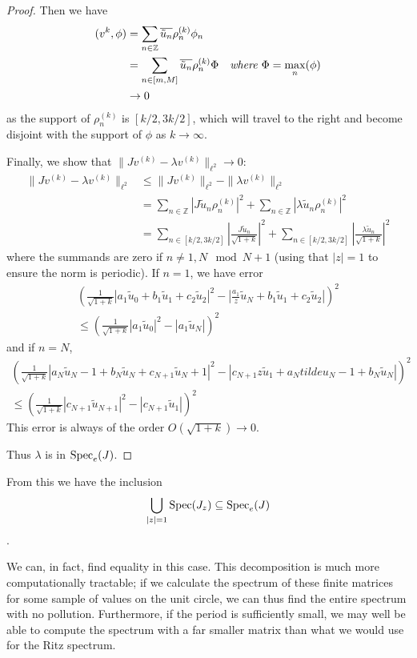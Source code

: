 \documentclass[../main.tex]{subfiles}
\begin{document}
\begin{proof}
Then we have
\begin{align*}
  (v^{k}, \phi) & =  \sum_{n \in \mathbb{Z}}
  \overline{\tilde{u}_n} \rho_n^{(k)} \phi_n & \\
  & = \sum_{n \in [m, M]} \overline{\tilde{u}_n} \rho_n^{(k)} \Phi 
    & \text{\emph{where $\Phi = \max_{n}(\phi)$}} \\
  & \rightarrow 0 & 
\end{align*}
  as the support of $\rho_n^{(k)}$ is $[k/2, 3k/2]$, which will travel to the 
  right and become disjoint with the support of $\phi$ as $k \rightarrow \infty$.

Finally, we show that $\|Jv^{(k)} - \lambda v^{(k)}\|_{\ell^2} \rightarrow 0$:
\begin{align*}
    \|Jv^{(k)} - \lambda v^{(k)}\|_{\ell^2} & \leq \|Jv^{(k)}\|_{\ell^2}  - \|\lambda v^{(k)}\|_{\ell^2}  \\
    & = \sum_{n \in \mathbb{Z}}|J\tilde{u}_n \rho_n^{(k)}|^2 + \sum_{n \in \mathbb{Z}}|\lambda\tilde{u}_n \rho_n^{(k)}|^2 \\
    & = \sum_{n \in [k/2, 3k/2]}|\frac{J\tilde{u}_n}{\sqrt{1+k}}|^2 + \sum_{n \in [k/2, 3k/2]}|\frac{\lambda\tilde{u}_n}{\sqrt{1+k}}|^2
\end{align*}
  where the summands are zero if $n \neq {1, N}\mod N+1$ (using that $|z| = 1$ to ensure the norm is periodic).
  If $n = 1$, we have error
\begin{align*}
  (\frac{1}{\sqrt{1+k}}|a_1 \tilde{u}_0 + b_1 \tilde{u}_1 + c_2 \tilde{u}_2|^2 - |\frac{a_1}{z}\tilde{u}_N + b_1 \tilde{u}_1 + c_2 \tilde{u}_2|)^2 \\
  \leq (\frac{1}{\sqrt{1+k}}|a_1 \tilde{u}_0|^2 - |a_1 \tilde{u}_N|)^2
\end{align*}
  and if $n = N$,
\begin{align*}
  (\frac{1}{\sqrt{1+k}}|a_N \tilde{u}_N-1 + b_N \tilde{u}_N + c_{N+1} \tilde{u}_N+1|^2 - |c_{N+1}z\tilde{u}_1 + a_N tilde{u}_N-1 + b_N \tilde{u}_N|)^2 \\
  \leq (\frac{1}{\sqrt{1+k}}|c_{N+1} \tilde{u}_{N+1}|^2 - |c_{N+1} \tilde{u}_1|)^2
\end{align*}
This error is always of the order $O(\sqrt{1 + k}) \rightarrow 0$.

Thus $\lambda$ is in $\mathrm{Spec}_e(J)$. \end{proof} From this we have the inclusion
$$\bigcup_{|z|=1} \mathrm{Spec}(J_z) \subseteq \mathrm{Spec}_e(J)$$.

We can, in fact, find equality in this case. This decomposition is much more
computationally tractable; if we calculate the spectrum of these finite
matrices for some sample of values on the unit circle, we can thus find the
entire spectrum with no pollution. Furthermore, if the period is sufficiently
small, we may well be able to compute the spectrum with a far smaller matrix
than what we would use for the Ritz spectrum.
\end{document}
